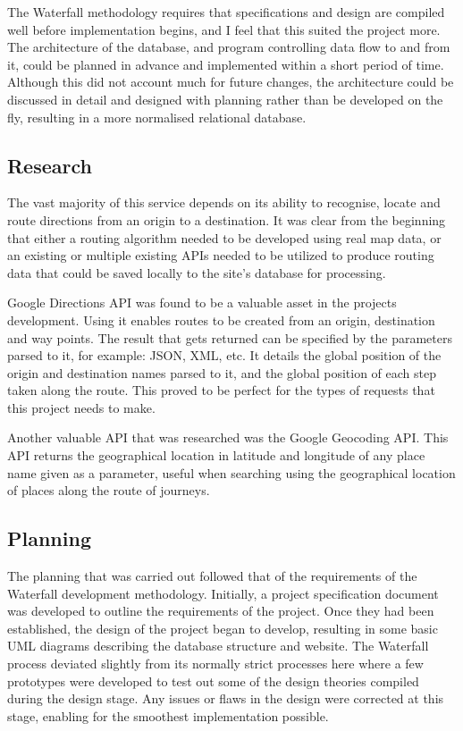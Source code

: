 The Waterfall methodology requires that specifications and design are compiled well before implementation begins, and I feel that this suited the project more. The architecture of the database, and program controlling data flow to and from it, could be planned in advance and implemented within a short period of time. Although this did not account much for future changes, the architecture could be discussed in detail and designed with planning rather than be developed on the fly, resulting in a more normalised relational database.

\subsection{Research}
The vast majority of this service depends on its ability to recognise, locate and route directions from an origin to a destination. It was clear from the beginning that either a routing algorithm needed to be developed using real map data, or an existing or multiple existing APIs needed to be utilized to produce routing data that could be saved locally to the site's database for processing. 

Google Directions API\cite{google_directions_api} was found to be a valuable asset in the projects development. Using it enables routes to be created from an origin, destination and way points. The result that gets returned can be specified by the parameters parsed to it, for example: JSON, XML, etc. It details the global position of the origin and destination names parsed to it, and the global position of each step taken along the route. This proved to be perfect for the types of requests that this project needs to make. 

Another valuable API that was researched was the Google Geocoding API\cite{google_geocoding_api}. This API returns the geographical location in latitude and longitude of any place name given as a parameter, useful when searching using the geographical location of places along the route of journeys.

\subsection{Planning}
The planning that was carried out followed that of the requirements of the Waterfall development methodology. Initially, a project specification document was developed to outline the requirements of the project. Once they had been established, the design of the project began to develop, resulting in some basic UML diagrams describing the database structure and website. The Waterfall process deviated slightly from its normally strict processes here where a few prototypes were developed to test out some of the design theories compiled during the design stage. Any issues or flaws in the design were corrected at this stage, enabling for the smoothest implementation possible.


